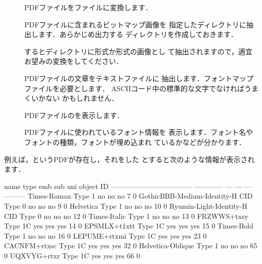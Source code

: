 \begin{description}
 \item[] 
  PDFファイルを{\PS}ファイルに変換します．
 \item[]
  PDFファイルに含まれるビットマップ画像を
  指定したディレクトリに抽出します．あらかじめ出力する
  ディレクトリを作成しておきます．

\begin{InTerm}
\end{InTerm}

するとディレクトリに形式か形式の画像とし
て抽出されますので，適宜お望みの変換をしてください．

 \item[]PDFファイルの文章をテキストファイルに
  抽出します．フォントマップファイルを必要とします．
  ASCIIコード中の標準的な文字でなければうまくいかない
  かもしれません．

 \item[] PDFファイルのを表示します．

 \item[] PDFファイルに使われているフォント情報を
  表示します．フォント名やフォントの種類，フォントが埋め込まれ
  ているかなどが分かります．
\end{description}

例えば，というPDFが存在し，それをした
とすると次のような情報が表示されます．


\begin{plainfile}
name                                type         emb sub uni object ID
----------------------------------- ------------ --- --- --- ---------
Times-Roman                         Type 1       no  no  no       7  0
GothicBBB-Medium-Identity-H         CID Type 0   no  no  no       9  0
Helvetica                           Type 1       no  no  no      10  0
Ryumin-Light-Identity-H             CID Type 0   no  no  no      12  0
Times-Italic                        Type 1       no  no  no      13  0
FRZWWS+txsy                         Type 1C      yes yes yes     14  0
EPSMLX+t1xtt                        Type 1C      yes yes yes     15  0
Times-Bold                          Type 1       no  no  no      16  0
LEPUME+rtxmi                        Type 1C      yes yes yes     23  0
CACNFM+rtxsc                        Type 1C      yes yes yes     32  0
Helvetica-Oblique                   Type 1       no  no  no      65  0
UQXVYG+rtxr                         Type 1C      yes yes yes     66  0 
\end{plainfile}


